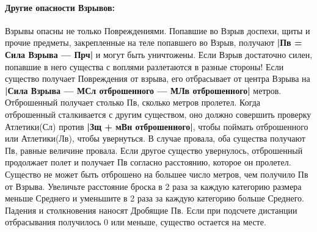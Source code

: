 \paragraph{Другие опасности Взрывов:} Взрывы опасны не только Повреждениями. Попавшие во Взрыв доспехи, щиты и прочие предметы, закрепленные на теле попавшего во Взрыв, получают \textbf{|Пв = Сила Взрыва — Прч|} и могут быть уничтожены. Если Взрыв достаточно силен, попавшие в него существа с воплями разлетаются в разные стороны! Если существо получает Повреждения от взрыва, его отбрасывает от центра Взрыва на \textbf{|Сила Взрыва — МСл отброшенного — МЛв отброшенного|} метров. Отброшенный получает столько Пв, сколько метров пролетел. Когда отброшенный сталкивается с другим существом, оно должно совершить проверку Атлетики(Сл) против \textbf{|Зщ + мВн отброшенного|}, чтобы поймать отброшенного или Атлетики(Лв), чтобы увернуться. В случае провала, оба существа получают Пв, равные величине провала. Если другое существо увернулось, отброшенный продолжает полет и получает Пв согласно расстоянию, которое он пролетел. Существо не может быть отброшено на большее число метров, чем получило Пв от Взрыва. Увеличьте расстояние броска в 2 раза за каждую категорию размера меньше Среднего и уменьшите в 2 раза за каждую категорию больше Среднего. Падения и столкновения наносят Дробящие Пв.
\newline
Если при подсчете дистанции отбрасывания получилось 0 или меньше, существо остается на месте.
